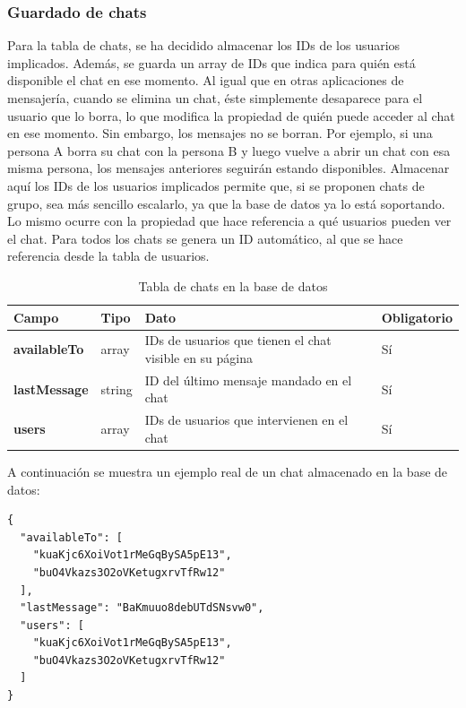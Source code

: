 \documentclass[a4paper, 12pt]{article}
\begin{document}
\subsubsection{Guardado de chats}

Para la tabla de chats, se ha decidido almacenar los IDs de los usuarios implicados. Además, se guarda un array de IDs que indica para quién está disponible el chat en ese momento. Al igual que en otras aplicaciones de mensajería, cuando se elimina un chat, éste simplemente desaparece para el usuario que lo borra, lo que modifica la propiedad de quién puede acceder al chat en ese momento. Sin embargo, los mensajes no se borran. Por ejemplo, si una persona A borra su chat con la persona B y luego vuelve a abrir un chat con esa misma persona, los mensajes anteriores seguirán estando disponibles. Almacenar aquí los IDs de los usuarios implicados permite que, si se proponen chats de grupo, sea más sencillo escalarlo, ya que la base de datos ya lo está soportando. Lo mismo ocurre con la propiedad que hace referencia a qué usuarios pueden ver el chat. Para todos los chats se genera un ID automático, al que se hace referencia desde la tabla de usuarios.

\begin{table}[H]
\label{tab:chats}
	\begin{tabular}{|m{3cm}|m{2cm}|m{5cm}|m{3cm}|}
	\hline
	\textbf{Campo} & \textbf{Tipo} & \textbf{Dato} & \textbf{Obligatorio} \\ 
	\hline
	\textbf{availableTo} & array & IDs de usuarios que tienen el chat visible en su página &  Sí \\ 
	\hline
	\textbf{lastMessage} & string & ID del último mensaje mandado en el chat &  Sí \\ 
	\hline
	\textbf{users} &  array & IDs de usuarios que intervienen en el chat &  Sí  \\ 
	\hline
	\end{tabular}
\caption{Tabla de chats en la base de datos}
\end{table}

A continuación se muestra un ejemplo real de un chat almacenado en la base de datos: 

\begin{verbatim}
{
  "availableTo": [
    "kuaKjc6XoiVot1rMeGqBySA5pE13",
    "buO4Vkazs3O2oVKetugxrvTfRw12"
  ],
  "lastMessage": "BaKmuuo8debUTdSNsvw0",
  "users": [
    "kuaKjc6XoiVot1rMeGqBySA5pE13",
    "buO4Vkazs3O2oVKetugxrvTfRw12"
  ]
}
\end{verbatim}
\end{document}
